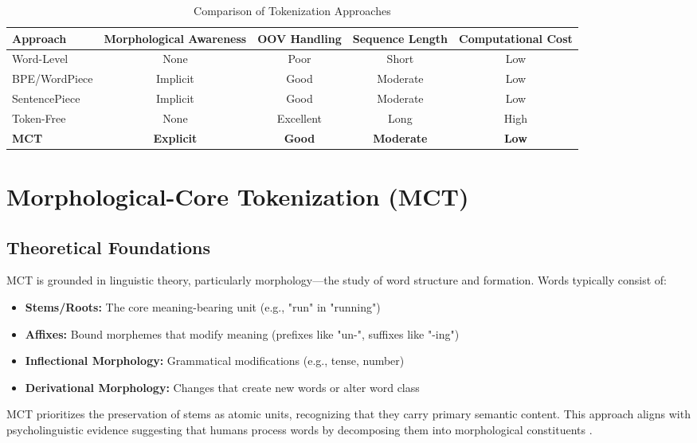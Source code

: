\documentclass[conference]{IEEEtran}
\begin{document}
\begin{table}[h]
\centering
\caption{Comparison of Tokenization Approaches}
\label{tab:token_comparison}
\begin{tabular}{lcccc}
\toprule
\textbf{Approach} & \textbf{Morphological Awareness} & \textbf{OOV Handling} & \textbf{Sequence Length} & \textbf{Computational Cost} \\
\midrule
Word-Level & None & Poor & Short & Low \\
BPE/WordPiece & Implicit & Good & Moderate & Low \\
SentencePiece & Implicit & Good & Moderate & Low \\
Token-Free & None & Excellent & Long & High \\
\textbf{MCT} & \textbf{Explicit} & \textbf{Good} & \textbf{Moderate} & \textbf{Low} \\
\bottomrule
\end{tabular}
\end{table}

\section{Morphological-Core Tokenization (MCT)}
\label{sec:mct}

\subsection{Theoretical Foundations}
MCT is grounded in linguistic theory, particularly morphology—the study of word structure and formation. Words typically consist of:
\begin{itemize}
    \item \textbf{Stems/Roots:} The core meaning-bearing unit (e.g., "run" in "running")
    \item \textbf{Affixes:} Bound morphemes that modify meaning (prefixes like "un-", suffixes like "-ing")
    \item \textbf{Inflectional Morphology:} Grammatical modifications (e.g., tense, number)
    \item \textbf{Derivational Morphology:} Changes that create new words or alter word class
\end{itemize}

MCT prioritizes the preservation of stems as atomic units, recognizing that they carry primary semantic content. This approach aligns with psycholinguistic evidence suggesting that humans process words by decomposing them into morphological constituents \cite{marslen1994morphology}.
\end{document}
